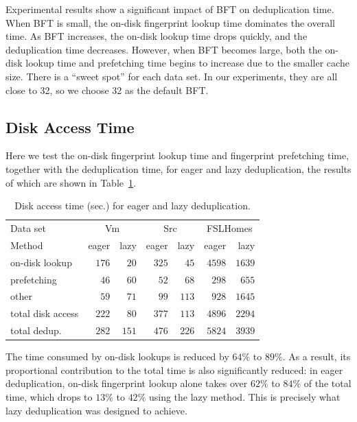 \documentclass[prodmode,acmtecs]{acmsmall}
\begin{document}
Experimental results show a significant impact of BFT on deduplication time. When BFT is small, the on-disk fingerprint lookup time dominates the overall time. As BFT increases, the on-disk lookup time drops quickly, and the deduplication time decreases. However, when BFT becomes large, both the on-disk lookup time and prefetching time begins to increase due to the smaller cache size. There is a ``sweet spot'' for each data set. In our experiments, they are all close to 32, so we choose 32 as the default BFT.

\subsection{Disk Access Time}

Here we test the on-disk fingerprint lookup time and fingerprint prefetching time, together with the deduplication time, for eager and lazy deduplication, the results of which are shown in Table~\ref{tab:disk-bar}.

\begin{table}[htp]
\centering
\begin{tabular}{lrrrrrr}
\toprule
Data set & \multicolumn{2}{c}{Vm} & \multicolumn{2}{c}{Src} & \multicolumn{2}{c}{FSLHomes} \\
\cmidrule(lr){2-3} \cmidrule(lr){4-5} \cmidrule(lr){6-7}
Method & eager & lazy & eager & lazy & eager & lazy \\
\midrule
on-disk lookup & $176$ & $20$ & $325$ & $45$ & $4598$ & $1639$ \\
prefetching & $46$ & $60$ & $52$ & $68$ & $298$ & $655$ \\
other & $59$ & $71$ & $99$ & $113$ & $928$ & $1645$ \\
\midrule
total disk access & $222$ & $80$ & $377$ & $113$ & $4896$ & $2294$ \\
\midrule
total dedup. & $282$ & $151$ & $476$ & $226$ & $5824$ & $3939$\\
\bottomrule
\end{tabular}
\caption{Disk access time (sec.) for eager and lazy deduplication.}
\label{tab:disk-bar}
\end{table}

The time consumed by on-disk lookups is reduced by $64\%$ to $89\%$. As a result, its proportional contribution to the total time is also significantly reduced: in eager deduplication, on-disk fingerprint lookup alone takes over $62\%$ to $84\%$ of the total time, which drops to $13\%$ to $42\%$ using the lazy method.  This is precisely what lazy deduplication was designed to achieve.
\end{document}
